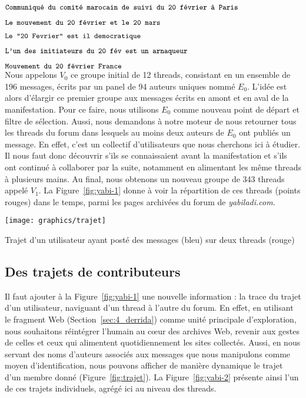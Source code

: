 \documentclass[symmetric,justified,marginals=raggedouter]{tufte-book}
\begin{document}
\noindent $\small \texttt{Communiqué du comité marocain de suivi du 20 février à Paris}$

\noindent $\small \texttt{Le mouvement du 20 février et le 20 mars}$

\noindent $\small \texttt{Le "20 Fevrier" est il democratique}$

\noindent $\small \texttt{L'un des initiateurs du 20 fév est un arnaqueur}$

\noindent $\small \texttt{Mouvement du 20 février France}$\\

\noindent Nous appelons $V_0$ ce groupe initial de 12 threads, consistant en un ensemble de 196 messages, écrits par un panel de 94 auteurs uniques nommé $E_0$. L'idée est alors d'élargir ce premier groupe aux messages écrits en amont et en aval de la manifestation. Pour ce faire, nous utilisons $E_0$ comme nouveau point de départ et filtre de sélection. Aussi, nous demandons à notre moteur de nous retourner tous les threads du forum dans lesquels au moins deux auteurs de $E_0$ ont publiés un message. En effet, c'est un collectif d'utilisateurs que nous cherchons ici à étudier. Il nous faut donc découvrir s'ils se connaissaient avant la manifestation et s'ils ont continué à collaborer par la suite, notamment en alimentant les même threads à plusieurs mains. Au final, nous obtenons un nouveau groupe de 343 threads appelé $V_1$. La Figure~\ref{fig:yabi-1} donne à voir la répartition de ces threads (points rouges) dans le temps, parmi les pages archivées du forum de \textit{yabiladi.com}.

\begin{marginfigure}%
  \texttt{[image: graphics/trajet]}
  \vspace*{0.2cm}  
  \caption{Trajet d'un utilisateur ayant posté des messages (bleu) sur deux threads (rouge)}
  \label{fig:trajet}
\end{marginfigure} 

\subsection{Des trajets de contributeurs}

\noindent Il faut ajouter à la Figure~\ref{fig:yabi-1} une nouvelle information : la trace du trajet d'un utilisateur, naviguant d'un thread à l'autre du forum. En effet, en utilisant le fragment Web (Section~\ref{sec:4_derrida}) comme unité principale d'exploration, nous souhaitons réintégrer l'humain au cœur des archives Web, revenir aux gestes de celles et ceux qui alimentent quotidiennement les sites collectés. Aussi, en nous servant des noms d'auteurs associés aux messages que nous manipulons comme moyen d'identification, nous pouvons afficher de manière dynamique le trajet d'un membre donné (Figure~\ref{fig:trajet}). La Figure~\ref{fig:yabi-2} présente ainsi l'un de ces trajets individuels, agrégé ici au niveau des threads. 
\end{document}
